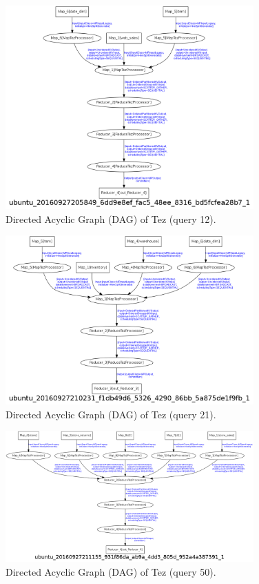 \documentclass[10pt]{article}
\begin{document}
\begin{figure}
\begin{center}
\includegraphics[width=0.85\textwidth]{pic/dag_tez_query12}
\caption{Directed Acyclic Graph (DAG) of Tez (query 12).}
\label{fig:q1d_tez_12}
\end{center}
\end{figure}

\begin{figure}
\begin{center}
\includegraphics[width=0.85\textwidth]{pic/dag_tez_query21}
\caption{Directed Acyclic Graph (DAG) of Tez (query 21).}
\label{fig:q1d_tez_21}
\end{center}
\end{figure}

\begin{figure}
\begin{center}
\includegraphics[width=0.85\textwidth]{pic/dag_tez_query50}
\caption{Directed Acyclic Graph (DAG) of Tez (query 50).}
\label{fig:q1d_tez_50}
\end{center}
\end{figure}
\end{document}

